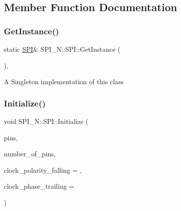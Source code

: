 \subsection{Member Function Documentation}
\hypertarget{class_s_p_i___n_1_1_s_p_i_abc266ff9d817b8d4437d1da47fe8e7ae}{}\label{class_s_p_i___n_1_1_s_p_i_abc266ff9d817b8d4437d1da47fe8e7ae} 
\subsubsection{\texorpdfstring{Get\+Instance()}{GetInstance()}}
{\footnotesize\ttfamily static \hyperlink{class_s_p_i___n_1_1_s_p_i}{S\+PI}\& S\+P\+I\+\_\+\+N\+::\+S\+P\+I\+::\+Get\+Instance (\begin{DoxyParamCaption}{ }\end{DoxyParamCaption})\hspace{0.3cm}{\ttfamily [inline]}, {\ttfamily [static]}}

A Singleton implementation of this class \hypertarget{class_s_p_i___n_1_1_s_p_i_ab0517cd53e32d224a0171e6eeb200870}{}\label{class_s_p_i___n_1_1_s_p_i_ab0517cd53e32d224a0171e6eeb200870} 
\subsubsection{\texorpdfstring{Initialize()}{Initialize()}}
{\footnotesize\ttfamily void S\+P\+I\+\_\+\+N\+::\+S\+P\+I\+::\+Initialize (\begin{DoxyParamCaption}\item[{\hyperlink{struct_s_p_i___n_1_1_p_i_n}{P\+IN} $\ast$}]{pins,  }\item[{uint8\+\_\+t}]{number\+\_\+of\+\_\+pins,  }\item[{bool}]{clock\+\_\+polarity\+\_\+falling = {},  }\item[{bool}]{clock\+\_\+phase\+\_\+trailing = {} }\end{DoxyParamCaption})}

